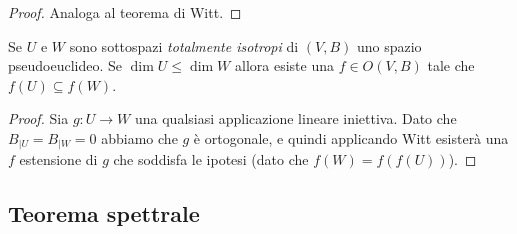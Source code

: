\documentclass[11pt]{scrartcl}
\begin{document}
 	\begin{proof}
 		Analoga al teorema di Witt.
 	\end{proof}
	\begin{corollary}
		Se $U$ e $W$ sono sottospazi \textit{totalmente isotropi} di $(V,B)$ uno spazio pseudoeuclideo. Se $\dim U \le \dim W$ allora esiste una $f\in O(V,B)$ tale che $f(U)\subseteq f(W)$.
	\end{corollary}
	\begin{proof}
		Sia $g:U\to W$ una qualsiasi applicazione lineare iniettiva. Dato che $B_{\mid U}=B_{\mid W}=0$ abbiamo che $g$ è ortogonale, e quindi applicando Witt esisterà una $f$ estensione di $g$ che soddisfa le ipotesi (dato che $f(W)=f(f(U))$).
	\end{proof}
	\subsection{Teorema spettrale}
	
\end{document}
